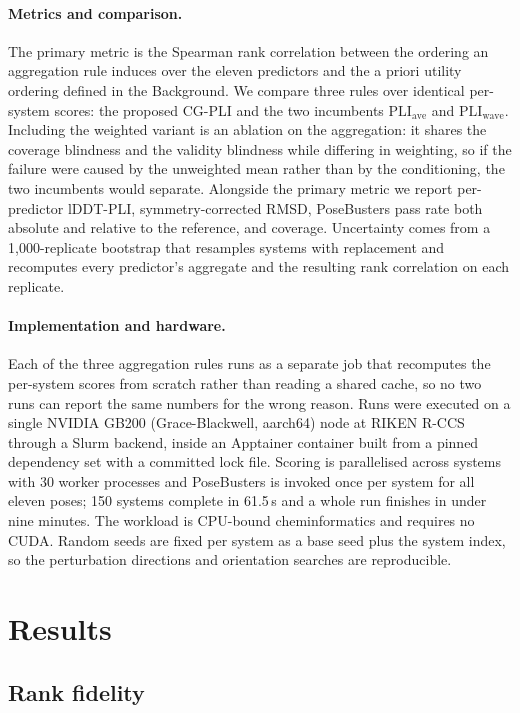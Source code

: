 \documentclass{article} %
\begin{document}
\paragraph{Metrics and comparison.} The primary metric is the Spearman rank correlation
between the ordering an aggregation rule induces over the eleven predictors and the a
priori utility ordering defined in the Background. We compare three rules over identical
per-system scores: the proposed CG-PLI and the two incumbents
$\mathrm{PLI}_{\text{ave}}$ and $\mathrm{PLI}_{\text{wave}}$. Including the weighted
variant is an ablation on the aggregation: it shares the coverage blindness and the
validity blindness while differing in weighting, so if the failure were caused by the
unweighted mean rather than by the conditioning, the two incumbents would separate.
Alongside the primary metric we report per-predictor lDDT-PLI, symmetry-corrected RMSD,
PoseBusters pass rate both absolute and relative to the reference, and coverage.
Uncertainty comes from a 1{,}000-replicate bootstrap that resamples systems with
replacement and recomputes every predictor's aggregate and the resulting rank
correlation on each replicate.

\paragraph{Implementation and hardware.} Each of the three aggregation rules runs as a
separate job that recomputes the per-system scores from scratch rather than reading a
shared cache, so no two runs can report the same numbers for the wrong reason. Runs were
executed on a single NVIDIA GB200 (Grace-Blackwell, aarch64) node at RIKEN R-CCS through
a Slurm backend, inside an Apptainer container built from a pinned dependency set with a
committed lock file. Scoring is parallelised across systems with 30 worker processes and
PoseBusters is invoked once per system for all eleven poses; 150 systems complete in
61.5\,s and a whole run finishes in under nine minutes. The workload is CPU-bound
cheminformatics and requires no CUDA. Random seeds are fixed per system as a base seed
plus the system index, so the perturbation directions and orientation searches are
reproducible.

\section{Results}
\label{sec:results}
\subsection{Rank fidelity}
\end{document}
